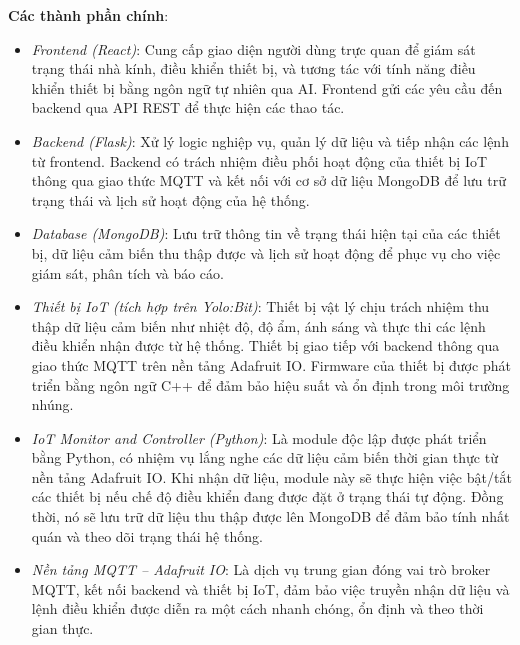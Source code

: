 \textbf{Các thành phần chính}:
\begin{itemize}
\item \textit{Frontend (React)}: Cung cấp giao diện người dùng trực quan để giám sát trạng thái nhà kính, điều khiển thiết bị, và tương tác với tính năng điều khiển thiết bị bằng ngôn ngữ tự nhiên qua AI. Frontend gửi các yêu cầu đến backend qua API REST để thực hiện các thao tác.

\item \textit{Backend (Flask)}: Xử lý logic nghiệp vụ, quản lý dữ liệu và tiếp nhận các lệnh từ frontend. Backend có trách nhiệm điều phối hoạt động của thiết bị IoT thông qua giao thức MQTT và kết nối với cơ sở dữ liệu MongoDB để lưu trữ trạng thái và lịch sử hoạt động của hệ thống.

\item \textit{Database (MongoDB)}: Lưu trữ thông tin về trạng thái hiện tại của các thiết bị, dữ liệu cảm biến thu thập được và lịch sử hoạt động để phục vụ cho việc giám sát, phân tích và báo cáo.

\item \textit{Thiết bị IoT (tích hợp trên Yolo:Bit)}: Thiết bị vật lý chịu trách nhiệm thu thập dữ liệu cảm biến như nhiệt độ, độ ẩm, ánh sáng và thực thi các lệnh điều khiển nhận được từ hệ thống. Thiết bị giao tiếp với backend thông qua giao thức MQTT trên nền tảng Adafruit IO. Firmware của thiết bị được phát triển bằng ngôn ngữ C++ để đảm bảo hiệu suất và ổn định trong môi trường nhúng.

\item \textit{IoT Monitor and Controller (Python)}: Là module độc lập được phát triển bằng Python, có nhiệm vụ lắng nghe các dữ liệu cảm biến thời gian thực từ nền tảng Adafruit IO. Khi nhận dữ liệu, module này sẽ thực hiện việc bật/tắt các thiết bị nếu chế độ điều khiển đang được đặt ở trạng thái tự động. Đồng thời, nó sẽ lưu trữ dữ liệu thu thập được lên MongoDB để đảm bảo tính nhất quán và theo dõi trạng thái hệ thống.

\item \textit{Nền tảng MQTT – Adafruit IO}: Là dịch vụ trung gian đóng vai trò broker MQTT, kết nối backend và thiết bị IoT, đảm bảo việc truyền nhận dữ liệu và lệnh điều khiển được diễn ra một cách nhanh chóng, ổn định và theo thời gian thực.
\end{itemize}


